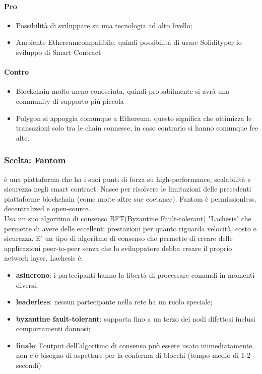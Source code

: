 		\paragraph{Pro}
		\begin{itemize}
			\item Possibilità di sviluppare su una tecnologia ad alto livello;
			\item Ambiente Ethereum\glo compatibile, quindi possibilità di usare Solidity\glo per lo sviluppo di Smart Contract
		\end{itemize}
		\paragraph{Contro}
		\begin{itemize}
			\item Blockchain molto meno conosciuta, quindi probabilmente si avrà una community di supporto più piccola
			\item Polygon si appoggia comunque a Ethereum\glo, questo significa che ottimizza le transazioni solo tra le chain connesse, in caso contrario si hanno comunque fee alte.
		\end{itemize}
	
		\subsubsection{Scelta: Fantom}
		è una piattaforma che ha i suoi punti di forza su high-performance, scalabilità e sicurezza negli smart contract. Nasce per risolvere le limitazioni delle precedenti piattaforme blockchain (come molte altre sue coetanee).
		Fantom è permissionless\glo, decentralized e open-source\glo.\\
		Usa un suo algoritmo di consenso BFT(Byzantine Fault-tolerant) "Lachesis" che permette di avere delle eccellenti prestazioni per quanto riguarda velocità, costo e sicurezza.
		E’ un tipo di algoritmo di consenso che permette di creare delle applicazioni peer-to-peer senza che lo sviluppatore debba creare il proprio network layer. Lachesis è:
		\begin{itemize}
			\item \textbf{asincrono}: i partecipanti hanno la libertà di processare comandi in momenti diversi;
			\item \textbf{leaderless}: nessun partecipante nella rete ha un ruolo speciale;
			\item \textbf{byzantine fault-tolerant}: supporta fino a un terzo dei nodi difettosi inclusi comportamenti dannosi; 
			\item \textbf{finale}: l’output dell’algoritmo di consenso può essere usato immediatamente, non c’è bisogno di aspettare per la conferma di blocchi (tempo medio di 1-2 secondi)
		\end{itemize}
		
